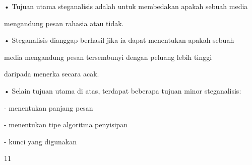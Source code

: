 \documentclass{article}
\begin{document}

• Tujuan utama steganalisis adalah untuk membedakan apakah sebuah media 

mengandung pesan rahasia atau tidak.

• Steganalisis dianggap berhasil jika ia dapat menentukan apakah sebuah 

media mengandung pesan tersembunyi dengan peluang lebih tinggi 

daripada menerka secara acak.

• Selain tujuan utama di atas, terdapat beberapa tujuan minor steganalisis:

   - menentukan panjang pesan

   - menentukan tipe algoritma penyisipan 

   - kunci yang digunakan 


11
\end{document}
